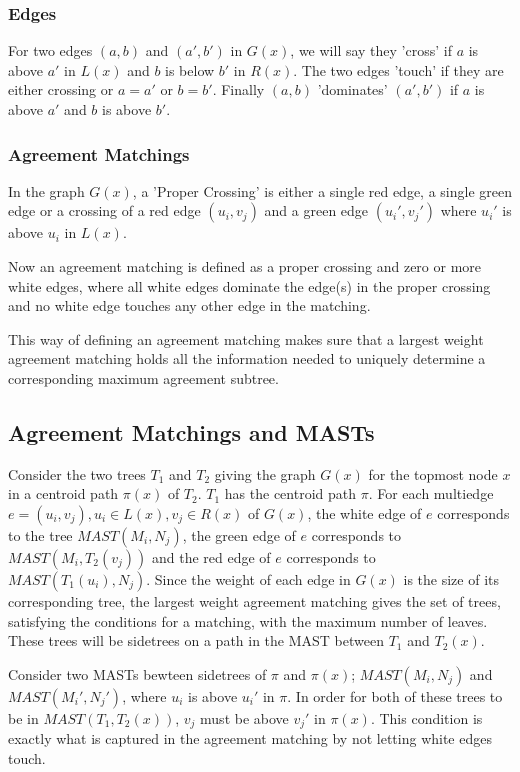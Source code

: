 \subsubsection{Edges}
For two edges $(a,b)$ and $(a',b')$ in $G(x)$, we will say they 'cross' if $a$ is above $a'$ in $L(x)$ and $b$ is below $b'$ in $R(x)$. The two edges 'touch' if they are either crossing or $a=a'$ or $b=b'$. Finally $(a,b)$ 'dominates' $(a',b')$ if $a$ is above $a'$ and $b$ is above $b'$.

\subsubsection{Agreement Matchings}
In the graph $G(x)$, a 'Proper Crossing' is either a single red edge, a single green edge or a crossing of a red edge $(u_i,v_j)$ and a green edge $(u_i',v_j')$ where $u_i'$ is above $u_i$ in $L(x)$.

Now an agreement matching is defined as a proper crossing and zero or more white edges, where all white edges dominate the edge(s) in the proper crossing and no white edge touches any other edge in the matching.

This way of defining an agreement matching makes sure that a largest weight agreement matching holds all the information needed to uniquely determine a corresponding maximum agreement subtree. 

\subsection{Agreement Matchings and MASTs}
Consider the two trees $T_1$ and $T_2$ giving the graph $G(x)$ for the topmost node $x$ in a centroid path $\pi(x)$ of $T_2$. $T_1$ has the centroid path $\pi$. For each multiedge $e = (u_i, v_j), u_i \in L(x), v_j \in R(x)$ of $G(x)$, the white edge of $e$ corresponds to the tree $MAST(M_i, N_j)$, the green edge of $e$ corresponds to $MAST(M_i, T_2(v_j))$ and the red edge of $e$ corresponds to $MAST(T_1(u_i), N_j)$. Since the weight of each edge in $G(x)$ is the size of its corresponding tree, the largest weight agreement matching gives the set of trees, satisfying the conditions for a matching, with the maximum number of leaves. These trees will be sidetrees on a path in the MAST between $T_1$ and $T_2(x)$.

Consider two MASTs bewteen sidetrees of $\pi$ and $\pi(x)$; $MAST(M_i, N_j)$ and $MAST(M_i', N_j')$, where $u_i$ is above $u_i'$ in $\pi$. In order for both of these trees to be in $MAST(T_1, T_2(x))$, $v_j$ must be above $v_j'$ in $\pi(x)$. This condition is exactly what is captured in the agreement matching by not letting white edges touch.

